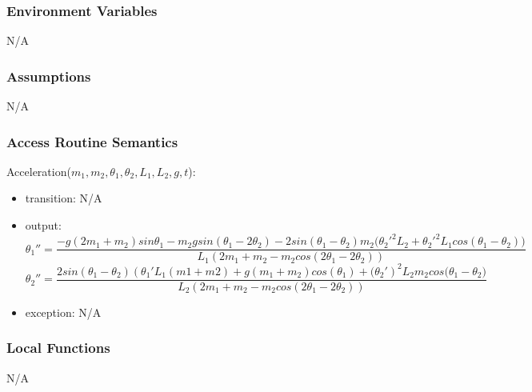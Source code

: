 \documentclass[12pt, titlepage]{article}
\begin{document}
\subsubsection{Environment Variables}
N/A
\subsubsection{Assumptions}
N/A
\subsubsection{Access Routine Semantics}

\noindent Acceleration($m_1,m_2,\theta_1, \theta_2, L_1, L_2, g, t$):
\begin{itemize}
\item transition: N/A
\item output: \[{\theta_1}''=\frac{-g(2m_1+m_2)sin\theta_1-m_2gsin(\theta_1-2\theta_2)-2sin(\theta_1-\theta_2)m_2({{\theta_2}'}^2L_2+{{\theta_2}'}^2L_1cos(\theta_1-\theta_2)\big)}{L_1(2m_1+m_2-m_2cos(2\theta_1-2\theta_2))}\] \[{\theta_2}''=\frac{2sin(\theta_1-\theta_2)({\theta_1}'L_1(m1+m2)+g(m_1+m_2)cos(\theta_1)+{(\theta_2}')^2L_2m_2cos(\theta_1-\theta_2\big)}{L_2(2m_1+m_2-m_2cos(2\theta_1-2\theta_2))}\] 
\item exception: N/A
\end{itemize}


\subsubsection{Local Functions}

N/A
\newpage
\end{document}
